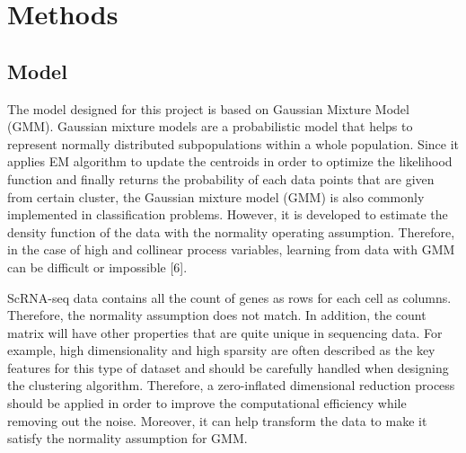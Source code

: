 \documentclass[12pt]{article}
\theoremstyle{definition}
\begin{document}
 


\section{Methods}

\subsection{Model}

The model designed for this project is based on Gaussian Mixture Model (GMM). Gaussian mixture models are a probabilistic model that helps to represent normally distributed subpopulations within a whole population. Since it applies EM algorithm to update the centroids in order to optimize the likelihood function and finally returns the probability of each data points that are given from certain cluster, the Gaussian mixture model (GMM) is also commonly implemented in classification problems. However, it is developed to estimate the density function of the data with the normality operating assumption. Therefore, in the case of high and collinear process variables, learning from data with GMM can be difficult or impossible [6].

ScRNA-seq data contains all the count of genes as rows for each cell as columns. Therefore, the normality assumption does not match. In addition, the count matrix will have other properties that are quite unique in sequencing data. For example, high dimensionality and high sparsity are often described as the key features for this type of dataset and should be carefully handled when designing the clustering algorithm. Therefore, a zero-inflated dimensional reduction process should be applied in order to improve the computational efficiency while removing out the noise. Moreover, it can help transform the data to make it satisfy the normality assumption for GMM.
\end{document}
